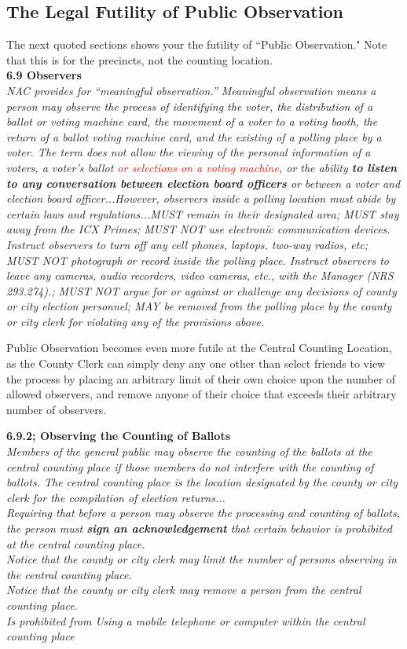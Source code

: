 \subsection{The Legal Futility of Public Observation}
The next quoted sections shows your the futility of ``Public Observation." Note that this is for the precincts, not the counting location.\\
\textbf{6.9 Observers}\\
\textit{NAC provides for “meaningful observation.” Meaningful observation means a person may observe the process
of identifying the voter, the distribution of a ballot or voting machine card, the movement of a voter to a
voting booth, the return of a ballot voting machine card, and the existing of a polling place by a voter. The
term does not allow the viewing of the personal information of a voters, a voter’s ballot \textcolor{red}{or selections on a voting machine}, or the ability \textbf{to listen to any conversation between election board officers} or between a voter and election board officer...However, observers inside a polling location must abide by certain laws and regulations...MUST remain in their designated area; MUST stay away from the ICX Primes; MUST NOT use electronic communication devices. Instruct observers to turn off any cell phones, laptops, two-way radios, etc; MUST NOT photograph or record inside the polling place. Instruct observers to leave any cameras, audio recorders, video cameras, etc., with the Manager (NRS 293.274).; MUST NOT argue for or against or challenge any decisions of county or city election personnel; MAY be removed from the polling place by the county or city clerk for violating any of the provisions above.}

Public Observation becomes even more futile at the Central Counting Location, as the County Clerk can simply deny any one other than select friends to view the process by placing an arbitrary limit of their own choice upon the number of allowed observers, and remove anyone of their choice that exceeds their arbitrary number of observers.

\textbf{6.9.2; Observing the Counting of Ballots}\\
\textit{Members of the general public may observe the counting of the ballots at the central counting place if those members do not interfere with the counting of ballots. The central counting place is the location designated
by the county or city clerk for the compilation of election returns...\\
Requiring that before a person may observe the processing and counting of ballots, the person must
\textbf{sign an acknowledgement} that certain behavior is prohibited at the central counting place.\\
Notice that the county or city clerk may limit the number of persons observing in the central counting
place.\\
Notice that the county or city clerk may remove a person from the central counting place.\\
Is prohibited from Using a mobile telephone or computer within the central counting place\\}

